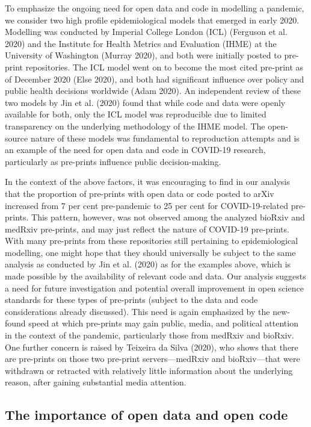 \documentclass[
]{article}
\begin{document}
To emphasize the ongoing need for open data and code in modelling a pandemic, we consider two high profile epidemiological models that emerged in early 2020. Modelling was conducted by Imperial College London (ICL) (Ferguson et al. 2020) and the Institute for Health Metrics and Evaluation (IHME) at the University of Washington (Murray 2020), and both were initially posted to pre-print repositories. The ICL model went on to become the most cited pre-print as of December 2020 (Else 2020), and both had significant influence over policy and public health decisions worldwide (Adam 2020). An independent review of these two models by Jin et al. (2020) found that while code and data were openly available for both, only the ICL model was reproducible due to limited transparency on the underlying methodology of the IHME model. The open-source nature of these models was fundamental to reproduction attempts and is an example of the need for open data and code in COVID-19 research, particularly as pre-prints influence public decision-making.

In the context of the above factors, it was encouraging to find in our analysis that the proportion of pre-prints with open data or code posted to arXiv increased from 7 per cent pre-pandemic to 25 per cent for COVID-19-related pre-prints. This pattern, however, was not observed among the analyzed bioRxiv and medRxiv pre-prints, and may just reflect the nature of COVID-19 pre-prints. With many pre-prints from these repositories still pertaining to epidemiological modelling, one might hope that they should universally be subject to the same analysis as conducted by Jin et al. (2020) as for the examples above, which is made possible by the availability of relevant code and data. Our analysis suggests a need for future investigation and potential overall improvement in open science standards for these types of pre-prints (subject to the data and code considerations already discussed). This need is again emphasized by the new-found speed at which pre-prints may gain public, media, and political attention in the context of the pandemic, particularly those from medRxiv and bioRxiv. One further concern is raised by Teixeira da Silva (2020), who shows that there are pre-prints on those two pre-print servers---medRxiv and bioRxiv---that were withdrawn or retracted with relatively little information about the underlying reason, after gaining substantial media attention.

\hypertarget{the-importance-of-open-data-and-open-code}{%
\subsection{The importance of open data and open code}\label{the-importance-of-open-data-and-open-code}}
\end{document}
